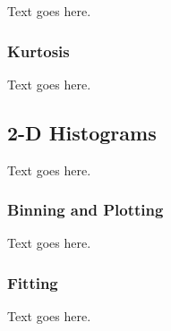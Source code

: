 Text goes here.



\subsubsection{Kurtosis}
\label{subsubsec:analysis--redshift_trends--kurtosis}


Text goes here.




\subsection{2-D Histograms}
\label{subsec:analysis--2d_histograms}


Text goes here.



\subsubsection{Binning and Plotting}
\label{subsubsec:analysis--2d_histograms--binning_plotting}


Text goes here.



\subsubsection{Fitting}
\label{subsubsec:analysis--2d_histograms--fitting}


Text goes here.




